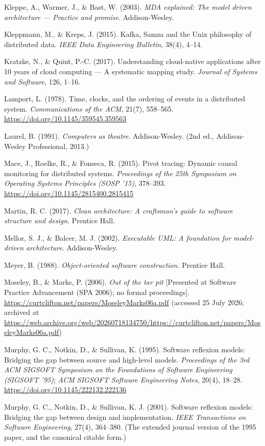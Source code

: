 \documentclass[
]{article}
\begin{document}
Kleppe, A., Warmer, J., \& Bast, W. (2003). \emph{MDA explained: The
model driven architecture --- Practice and promise}. Addison-Wesley.

Kleppmann, M., \& Kreps, J. (2015). Kafka, Samza and the Unix philosophy
of distributed data. \emph{IEEE Data Engineering Bulletin}, 38(4),
4--14.

Kratzke, N., \& Quint, P.-C. (2017). Understanding cloud-native
applications after 10 years of cloud computing --- A systematic mapping
study. \emph{Journal of Systems and Software}, 126, 1--16.

Lamport, L. (1978). Time, clocks, and the ordering of events in a
distributed system. \emph{Communications of the ACM}, 21(7), 558--565.
\url{https://doi.org/10.1145/359545.359563}

Laurel, B. (1991). \emph{Computers as theatre}. Addison-Wesley. (2nd
ed., Addison-Wesley Professional, 2013.)

Mace, J., Roelke, R., \& Fonseca, R. (2015). Pivot tracing: Dynamic
causal monitoring for distributed systems. \emph{Proceedings of the 25th
Symposium on Operating Systems Principles (SOSP '15)}, 378--393.
\url{https://doi.org/10.1145/2815400.2815415}

Martin, R. C. (2017). \emph{Clean architecture: A craftsman's guide to
software structure and design}. Prentice Hall.

Mellor, S. J., \& Balcer, M. J. (2002). \emph{Executable UML: A
foundation for model-driven architecture}. Addison-Wesley.

Meyer, B. (1988). \emph{Object-oriented software construction}. Prentice
Hall.

Moseley, B., \& Marks, P. (2006). \emph{Out of the tar pit} {[}Presented
at Software Practice Advancement (SPA 2006); no formal proceedings{]}.
\url{https://curtclifton.net/papers/MoseleyMarks06a.pdf} (accessed 25
July 2026; archived at
\url{https://web.archive.org/web/20260718134750/https://curtclifton.net/papers/MoseleyMarks06a.pdf})

Murphy, G. C., Notkin, D., \& Sullivan, K. (1995). Software reflexion
models: Bridging the gap between source and high-level models.
\emph{Proceedings of the 3rd ACM SIGSOFT Symposium on the Foundations of
Software Engineering (SIGSOFT '95)}; \emph{ACM SIGSOFT Software
Engineering Notes}, 20(4), 18--28.
\url{https://doi.org/10.1145/222132.222136}

Murphy, G. C., Notkin, D., \& Sullivan, K. J. (2001). Software reflexion
models: Bridging the gap between design and implementation. \emph{IEEE
Transactions on Software Engineering}, 27(4), 364--380. (The extended
journal version of the 1995 paper, and the canonical citable form.)
\end{document}
